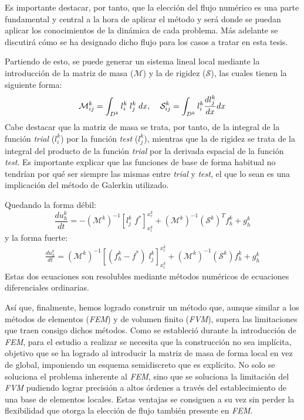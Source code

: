 \documentclass[11pt,a4paper,twoside,pdf]{article}
\numberwithin{equation}{section}
\begin{document}
Es importante destacar, por tanto, que la elección del flujo numérico es una parte fundamental y central a la hora de aplicar el método y será donde se puedan aplicar los conocimientos de la dinámica de cada problema. Más adelante se discutirá cómo se ha designado dicho flujo para los casos a tratar en esta tesis.

Partiendo de esto, se puede generar un sistema lineal local mediante la introducción de la matriz de masa ($\mathcal{M}$) y la de rigidez ($\mathcal{S}$), las cuales tienen la siguiente forma:
\begin{equation}
    \mathcal{M}^k_{ij}=\int_{D^k} l_i^k\;l_j^k\;dx, \;\;\;\; \mathcal{S}^k_{ij}=\int_{D^k}l_i^k\frac{dl_j^k}{dx}dx \notag
\end{equation}
Cabe destacar que la matriz de masa se trata, por tanto, de la integral de la función \textit{trial} ($l_i^k$) por la función \textit{test} ($l_j^k$), mientras que la de rigidez se trata de la integral del producto de la función \textit{trial} por la derivada espacial de la función \textit{test}. Es importante explicar que las funciones de base de forma habitual no tendrían por qué ser siempre las mismas entre \textit{trial} y \textit{test}, el que lo sean es una implicación del método de Galerkin utilizado.

Quedando la forma débil:
\begin{equation}
    \frac{du_h^k}{dt}=-\left( \mathcal{M}^k \right)^{-1}\left[l^k_j\;f^*\right]^{x_r^k}_{x_l^k}+\left( \mathcal{M}^k \right)^{-1}\left(\mathcal{S}^k\right)^Tf_h^k+g_h^k \label{weaktime} 
\end{equation}
y la forma fuerte:
\begin{equation}
\begin{split}
\frac{du_h^k}{dt} = \left( \mathcal{M}^k \right)^{-1}\left[(f^k_h-f^*)\;l^k_j\right]^{x_r^k}_{x_l^k} 
  +\left( \mathcal{M}^k \right)^{-1} \left(\mathcal{S}^k\right) f_h^k + g_h^k \label{strongtime}
\end{split}
\end{equation}
Estas dos ecuaciones son resolubles mediante métodos numéricos de ecuaciones diferenciales ordinarias. 

Así que, finalmente, hemos logrado construir un método que, aunque similar a los métodos de elementos  (\textit{FEM}) y de volumen finito (\textit{FVM}), supera las limitaciones que traen consigo dichos métodos. Como se estableció durante la introducción de \textit{FEM}, para el estudio a realizar se necesita que la construcción no sea implícita, objetivo que se ha logrado al introducir la matriz de masa de forma local en vez de global, imponiendo un esquema semidiscreto que es explícito. No solo se soluciona el problema inherente al \textit{FEM}, sino que se soluciona la limitación del \textit{FVM} pudiendo lograr precisión a altos órdenes a través del establecimiento de una base de elementos locales. Estas ventajas se consiguen a su vez sin perder la flexibilidad que otorga la elección de flujo también presente en \textit{FEM}.
\newpage
\end{document}
